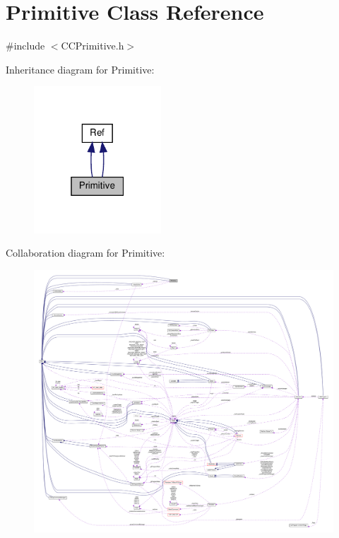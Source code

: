 \hypertarget{classPrimitive}{}\section{Primitive Class Reference}
\label{classPrimitive}


{\ttfamily \#include $<$C\+C\+Primitive.\+h$>$}



Inheritance diagram for Primitive\+:
\nopagebreak
\begin{figure}[H]
\begin{center}
\leavevmode
\includegraphics[width=135pt]{classPrimitive__inherit__graph}
\end{center}
\end{figure}


Collaboration diagram for Primitive\+:
\nopagebreak
\begin{figure}[H]
\begin{center}
\leavevmode
\includegraphics[width=350pt]{classPrimitive__coll__graph}
\end{center}
\end{figure}
